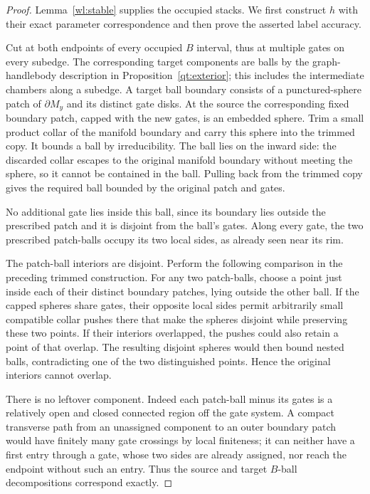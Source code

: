 \begin{proof}
Lemma~\ref{wl:stable} supplies the occupied stacks.  We first construct
$h$ with their exact parameter correspondence and then prove the
asserted label accuracy.

Cut at both endpoints of every occupied $B$ interval, thus at
multiple gates on every subedge.  The corresponding target
components are balls by the graph-handlebody description in
Proposition~\ref{qt:exterior}; this includes the intermediate
chambers along a subedge.  A target ball boundary consists of a
punctured-sphere patch of $\partial M_y$ and its distinct gate disks.
At the source the corresponding fixed boundary patch, capped with
the new gates, is an embedded sphere.  Trim a small product collar
of the manifold boundary and carry this sphere into the trimmed
copy.  It bounds a ball by irreducibility.  The ball lies on the
inward side: the discarded collar escapes to the original manifold
boundary without meeting the sphere, so it cannot be contained in
the ball.  Pulling back from the trimmed copy gives the required
ball bounded by the original patch and gates.

No additional gate lies inside this ball, since its boundary lies
outside the prescribed patch and it is disjoint from the ball's
gates.  Along every gate, the two prescribed patch-balls occupy its
two local sides, as already seen near its rim.

The patch-ball interiors are disjoint.  Perform the following
comparison in the preceding trimmed construction.  For any two
patch-balls, choose a point just inside each of their distinct
boundary patches, lying outside the other ball.  If the capped
spheres share gates, their opposite local sides permit arbitrarily
small compatible collar pushes there that make the spheres disjoint
while preserving these two points.  If their interiors overlapped,
the pushes could also retain a point of that overlap.  The resulting
disjoint spheres would then bound nested balls, contradicting one of
the two distinguished points.  Hence the original interiors cannot
overlap.

There is no leftover component.  Indeed each patch-ball minus its
gates is a relatively
open and closed connected region off the gate system.  A compact
transverse path from an unassigned component to an outer boundary
patch would have finitely many gate crossings by local finiteness;
it can neither have a first entry through a gate, whose two sides
are already assigned, nor reach the endpoint without such an
entry.  Thus the source and target $B$-ball decompositions
correspond exactly.


\end{proof}
